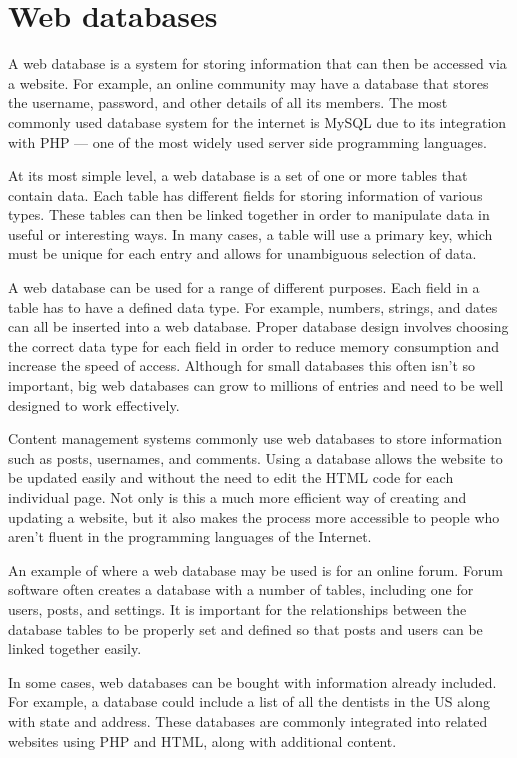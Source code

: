 
\section{Web databases}
A web database is a system for storing information that can then be accessed via a website. For example, an online community may have a database that stores the username, password, and other details of all its members. The most commonly used database system for the internet is MySQL due to its integration with PHP — one of the most widely used server side programming languages.

At its most simple level, a web database is a set of one or more tables that contain data. Each table has different fields for storing information of various types. These tables can then be linked together in order to manipulate data in useful or interesting ways. In many cases, a table will use a primary key, which must be unique for each entry and allows for unambiguous selection of data.

A web database can be used for a range of different purposes. Each field in a table has to have a defined data type. For example, numbers, strings, and dates can all be inserted into a web database. Proper database design involves choosing the correct data type for each field in order to reduce memory consumption and increase the speed of access. Although for small databases this often isn't so important, big web databases can grow to millions of entries and need to be well designed to work effectively.

Content management systems commonly use web databases to store information such as posts, usernames, and comments. Using a database allows the website to be updated easily and without the need to edit the HTML code for each individual page. Not only is this a much more efficient way of creating and updating a website, but it also makes the process more accessible to people who aren't fluent in the programming languages of the Internet.

An example of where a web database may be used is for an online forum. Forum software often creates a database with a number of tables, including one for users, posts, and settings. It is important for the relationships between the database tables to be properly set and defined so that posts and users can be linked together easily.

In some cases, web databases can be bought with information already included. For example, a database could include a list of all the dentists in the US along with state and address. These databases are commonly integrated into related websites using PHP and HTML, along with additional content.
